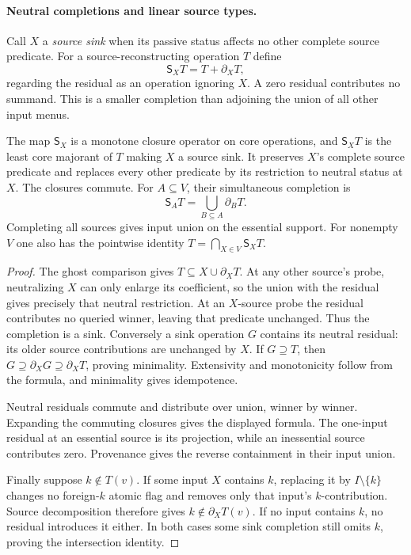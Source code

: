\paragraph{Neutral completions and linear source types.}
Call $X$ a \emph{source sink} when its passive status affects no other
complete source predicate. For a source-reconstructing operation $T$ define
\[
 \mathsf S_XT=T+\partial_XT,
\]
regarding the residual as an operation ignoring $X$. A zero residual
contributes no summand. This is a smaller completion than adjoining the
union of all other input menus.

\begin{proposition}\label{core:prop:sink-completions}
The map $\mathsf S_X$ is a monotone closure operator on core operations,
and $\mathsf S_XT$ is the least core majorant of $T$ making $X$ a source
sink. It preserves $X$'s complete source predicate and replaces every
other predicate by its restriction to neutral status at $X$.
The closures commute. For $A\subseteq V$, their simultaneous completion is
\[
 \mathsf S_AT=\bigcup_{B\subseteq A}\partial_BT.
\]
Completing all sources gives input union on the essential support.
For nonempty $V$ one also has the pointwise identity
$T=\bigcap_{X\in V}\mathsf S_XT$.
\end{proposition}
\begin{proof}
The ghost comparison gives $T\subseteq X\cup\partial_XT$.
At any other source's probe, neutralizing $X$ can only enlarge its
coefficient, so the union with the residual gives precisely that neutral
restriction. At an $X$-source probe the residual contributes no queried
winner, leaving that predicate unchanged. Thus the completion is a sink.
Conversely a sink operation $G$ contains its neutral residual: its older
source contributions are unchanged by $X$. If $G\supseteq T$, then
$G\supseteq\partial_XG\supseteq\partial_XT$, proving minimality.
Extensivity and monotonicity follow from the formula, and minimality
gives idempotence.

Neutral residuals commute and distribute over union, winner by winner.
Expanding the commuting closures gives the displayed formula.
The one-input residual at an essential source is its projection, while
an inessential source contributes zero. Provenance gives the reverse
containment in their input union.

Finally suppose $k\notin T(v)$. If some input $X$ contains $k$,
replacing it by $I\setminus\{k\}$ changes no foreign-$k$ atomic flag
and removes only that input's $k$-contribution. Source decomposition
therefore gives $k\notin\partial_XT(v)$. If no input contains $k$,
no residual introduces it either. In both cases some sink completion
still omits $k$, proving the intersection identity.
\end{proof}


